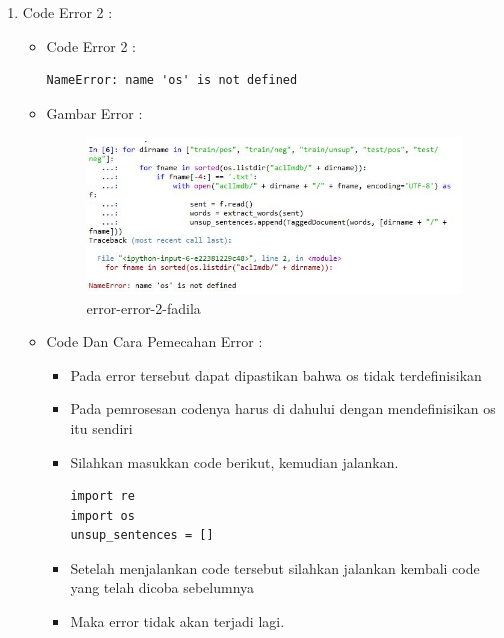 \begin{enumerate}
\begin{enumerate}
\par
\item Code Error 2 :
\begin{itemize}
\item Code Error 2 :
\begin{lstlisting}
NameError: name 'os' is not defined
\end{lstlisting}
\item Gambar Error :
\par
\begin{figure}[!hbtp]
\centering
\includegraphics[scale=0.3]{figures/error-error-2-fadila.jpg}
\caption{error-error-2-fadila}
\label{error-error-2-fadila}
\end{figure}
\par
\item Code Dan Cara Pemecahan Error :
\begin{itemize}
\item Pada error tersebut dapat dipastikan bahwa os tidak terdefinisikan
\item Pada pemrosesan codenya harus di dahului dengan mendefinisikan os itu sendiri
\item Silahkan masukkan code berikut, kemudian jalankan.
\begin{lstlisting}
import re
import os
unsup_sentences = []
\end{lstlisting}
\item Setelah menjalankan code tersebut silahkan jalankan kembali code yang telah dicoba sebelumnya
\item Maka error tidak akan terjadi lagi.
\end{itemize}
\end{itemize}
\end{enumerate}
\end{enumerate}